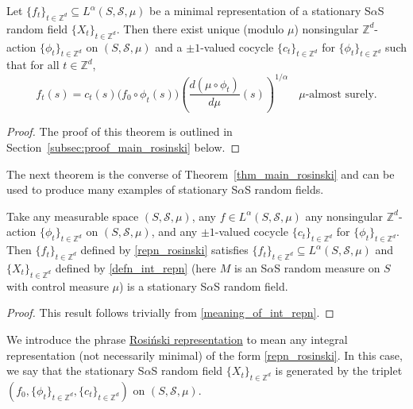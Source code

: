 \documentclass[12pt]{amsart}
\begin{document}
\begin{thm} \label{thm_main_rosinski} Let $\{f_t\}_{t \in {\mathbb{Z}^d}} \subseteq L^\alpha(S, \mathcal{S}, \mu)$ be a minimal representation of a stationary S$\alpha$S random field ${\{X_t\}_{t \in \mathbb{Z}^d}}$. Then there exist unique (modulo $\mu$) nonsingular ${\mathbb{Z}^d}$-action ${\{\phi_t\}_{t \in \mathbb{Z}^d}}$ on $(S, \mathcal{S}, \mu)$ and a $\pm 1$-valued cocycle $\{c_t\}_{t \in {\mathbb{Z}^d}}$ for ${\{\phi_t\}_{t \in \mathbb{Z}^d}}$ such that for all $t \in {\mathbb{Z}^d}$,
\begin{equation}
f_t(s)=c_t(s) \big(f_0 \circ \phi_t(s)\big) \left(\frac{d (\mu \circ \phi_t)}{d \mu}(s)\right)^{1/\alpha} \;\mbox{ $\mu$-almost surely}. \label{repn_rosinski}
\end{equation}
\end{thm}

\begin{proof} The proof of this theorem is outlined in Section~\ref{subsec:proof_main_rosinski} below.
\end{proof}

The next theorem is the converse of Theorem~\ref{thm_main_rosinski} and can be used to produce many examples of stationary S$\alpha$S random fields.

\begin{thm} \label{thm_converse_main_rosinski} Take any measurable space $(S, \mathcal{S}, \mu)$, any $f \in L^\alpha(S, \mathcal{S}, \mu)$ any nonsingular ${\mathbb{Z}^d}$-action ${\{\phi_t\}_{t \in \mathbb{Z}^d}}$ on $(S, \mathcal{S}, \mu)$, and any $\pm 1$-valued cocycle $\{c_t\}_{t \in {\mathbb{Z}^d}}$ for ${\{\phi_t\}_{t \in \mathbb{Z}^d}}$. Then $\{f_t\}_{t \in {\mathbb{Z}^d}} $ defined by \eqref{repn_rosinski} satisfies $\{f_t\}_{t \in {\mathbb{Z}^d}} \subseteq L^\alpha(S, \mathcal{S}, \mu)$ and ${\{X_t\}_{t \in \mathbb{Z}^d}}$ defined by \eqref{defn_int_repn} (here $M$ is an S$\alpha$S random measure on $S$ with control measure $\mu$) is a stationary S$\alpha$S random field.
\end{thm}

\begin{proof} This result follows trivially from \eqref{meaning_of_int_repn}.
\end{proof}

\begin{defn} We introduce the phrase \underline{Rosi\'{n}ski representation} to mean any integral representation (not necessarily minimal) of the form \eqref{repn_rosinski}. In this case, we say that the stationary S$\alpha$S random field ${\{X_t\}_{t \in \mathbb{Z}^d}}$ is generated by the triplet $\left(f_0, {\{\phi_t\}_{t \in \mathbb{Z}^d}}, \{c_t\}_{t \in {\mathbb{Z}^d}}\right)$ on $(S, \mathcal{S},\mu)$.
\end{defn}
\end{document}
